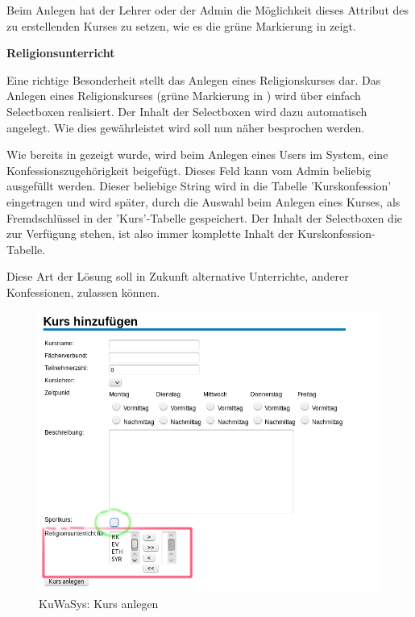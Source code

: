 Beim Anlegen hat der Lehrer oder der Admin die Möglichkeit dieses Attribut des zu erstellenden Kurses zu setzen, wie es die grüne Markierung in  zeigt.


\textbf{Religionsunterricht}

Eine richtige Besonderheit stellt das Anlegen eines Religionskurses dar.
Das Anlegen eines Religionskurses (grüne Markierung in ) wird über einfach Selectboxen realisiert. Der Inhalt der Selectboxen wird dazu automatisch angelegt. Wie dies gewährleistet wird soll nun näher besprochen werden.

Wie bereits in  gezeigt wurde, wird beim Anlegen eines Users im System, eine Konfessionszugehörigkeit beigefügt. Dieses Feld kann vom Admin beliebig ausgefüllt werden. 
Dieser beliebige String wird in die Tabelle 'Kurskonfession' eingetragen und wird später, durch die Auswahl beim Anlegen eines Kurses, als Fremdschlüssel in der 'Kurs'-Tabelle gespeichert.
Der Inhalt der Selectboxen die zur Verfügung stehen, ist also immer komplette Inhalt der Kurskonfession-Tabelle.

Diese Art der Lösung soll in Zukunft alternative Unterrichte, anderer Konfessionen, zulassen können.

\begin{figure}[H]
 \begin{center}
   \includegraphics[scale=0.6]{img/KursAnlegen_KuWaSys.png}
 \end{center}
 \caption[\textbf{KuWaSys: Kurs anlegen}]{KuWaSys: Kurs anlegen}
 \label{fig:KursAnlegen_KuWaSys}
\end{figure}

